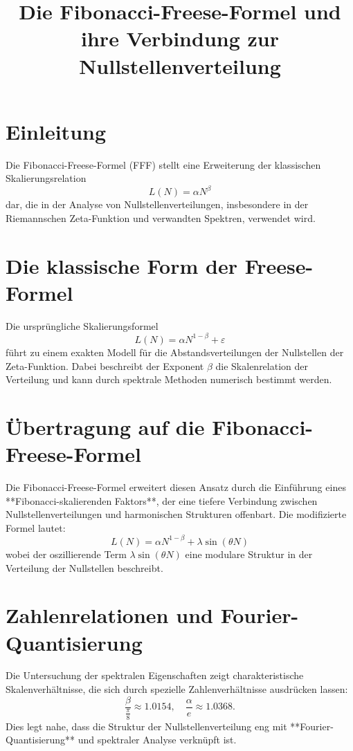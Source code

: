 \documentclass[a4paper,12pt]{article}
\title{Die Fibonacci-Freese-Formel und ihre Verbindung zur Nullstellenverteilung}
\author{}
\date{}
\begin{document}
\maketitle

\section{Einleitung}
Die Fibonacci-Freese-Formel (FFF) stellt eine Erweiterung der klassischen Skalierungsrelation 
\begin{equation}
    L(N) = \alpha N^\beta
\end{equation}
dar, die in der Analyse von Nullstellenverteilungen, insbesondere in der Riemannschen Zeta-Funktion und verwandten Spektren, verwendet wird.

\section{Die klassische Form der Freese-Formel}
Die ursprüngliche Skalierungsformel 
\begin{equation}
    L(N) = \alpha N^{1 - \beta} + \varepsilon
\end{equation}
führt zu einem exakten Modell für die Abstandsverteilungen der Nullstellen der Zeta-Funktion. Dabei beschreibt der Exponent \( \beta \) die Skalenrelation der Verteilung und kann durch spektrale Methoden numerisch bestimmt werden.

\section{Übertragung auf die Fibonacci-Freese-Formel}
Die Fibonacci-Freese-Formel erweitert diesen Ansatz durch die Einführung eines **Fibonacci-skalierenden Faktors**, der eine tiefere Verbindung zwischen Nullstellenverteilungen und harmonischen Strukturen offenbart. Die modifizierte Formel lautet:
\begin{equation}
    L(N) = \alpha N^{1 - \beta} + \lambda \sin(\theta N)
\end{equation}
wobei der oszillierende Term \(\lambda \sin(\theta N)\) eine modulare Struktur in der Verteilung der Nullstellen beschreibt.

\section{Zahlenrelationen und Fourier-Quantisierung}
Die Untersuchung der spektralen Eigenschaften zeigt charakteristische Skalenverhältnisse, die sich durch spezielle Zahlenverhältnisse ausdrücken lassen:
\begin{equation}
    \frac{\beta}{\frac{\pi}{8}} \approx 1.0154, \quad \frac{\alpha}{e} \approx 1.0368.
\end{equation}
Dies legt nahe, dass die Struktur der Nullstellenverteilung eng mit **Fourier-Quantisierung** und spektraler Analyse verknüpft ist.
\end{document}
